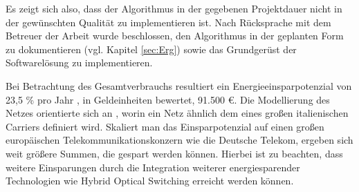Es zeigt sich also, dass der Algorithmus in der gegebenen Projektdauer nicht in der gewünschten Qualität zu implementieren ist. Nach Rücksprache mit dem Betreuer der Arbeit wurde beschlossen, den Algorithmus in der geplanten Form zu dokumentieren (vgl. Kapitel \ref{sec:Erg}) sowie das Grundgerüst der Softwarelösung zu implementieren. 

Bei Betrachtung des Gesamtverbrauchs resultiert ein Energieeinsparpotenzial von 23,5 \% pro Jahr  \cite[5]{Chiaraviglio2009}, in Geldeinheiten\cite{Proteus2016} bewertet, 91.500 €. Die Modellierung des Netzes orientierte sich an \cite{Chiaraviglio2009}, worin ein Netz ähnlich dem eines großen italienischen Carriers definiert wird. Skaliert man das Einsparpotenzial auf einen großen europäischen Telekommunikationskonzern wie die Deutsche Telekom, ergeben sich weit größere Summen, die gespart werden können. Hierbei ist zu beachten, dass weitere Einsparungen durch die Integration weiterer energiesparender Technologien wie Hybrid Optical Switching erreicht werden können.